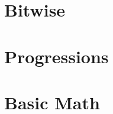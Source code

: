 \documentclass[10pt, twocolumn]{article}
\begin{document}
\section{Bitwise}




\section{Progressions}


\section{Basic Math}



\end{document}
